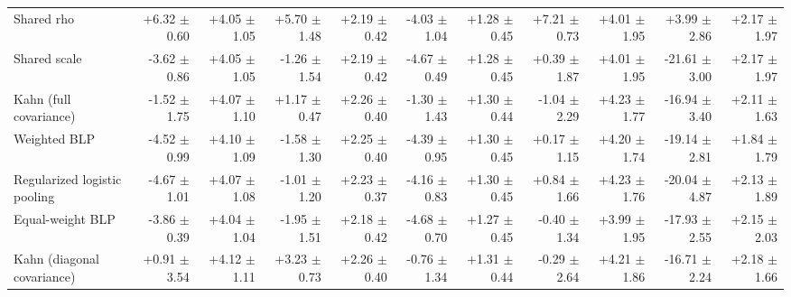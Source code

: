 \begin{tabular}{lrrrrrrrrrr}
Shared rho & +6.32 {\scriptsize $\pm$ 0.60} & +4.05 {\scriptsize $\pm$ 1.05} & +5.70 {\scriptsize $\pm$ 1.48} & +2.19 {\scriptsize $\pm$ 0.42} & -4.03 {\scriptsize $\pm$ 1.04} & +1.28 {\scriptsize $\pm$ 0.45} & +7.21 {\scriptsize $\pm$ 0.73} & +4.01 {\scriptsize $\pm$ 1.95} & +3.99 {\scriptsize $\pm$ 2.86} & +2.17 {\scriptsize $\pm$ 1.97} \\
Shared scale & -3.62 {\scriptsize $\pm$ 0.86} & +4.05 {\scriptsize $\pm$ 1.05} & -1.26 {\scriptsize $\pm$ 1.54} & +2.19 {\scriptsize $\pm$ 0.42} & -4.67 {\scriptsize $\pm$ 0.49} & +1.28 {\scriptsize $\pm$ 0.45} & +0.39 {\scriptsize $\pm$ 1.87} & +4.01 {\scriptsize $\pm$ 1.95} & -21.61 {\scriptsize $\pm$ 3.00} & +2.17 {\scriptsize $\pm$ 1.97} \\
Kahn (full covariance) & -1.52 {\scriptsize $\pm$ 1.75} & +4.07 {\scriptsize $\pm$ 1.10} & +1.17 {\scriptsize $\pm$ 0.47} & +2.26 {\scriptsize $\pm$ 0.40} & -1.30 {\scriptsize $\pm$ 1.43} & +1.30 {\scriptsize $\pm$ 0.44} & -1.04 {\scriptsize $\pm$ 2.29} & +4.23 {\scriptsize $\pm$ 1.77} & -16.94 {\scriptsize $\pm$ 3.40} & +2.11 {\scriptsize $\pm$ 1.63} \\
Weighted BLP & -4.52 {\scriptsize $\pm$ 0.99} & +4.10 {\scriptsize $\pm$ 1.09} & -1.58 {\scriptsize $\pm$ 1.30} & +2.25 {\scriptsize $\pm$ 0.40} & -4.39 {\scriptsize $\pm$ 0.95} & +1.30 {\scriptsize $\pm$ 0.45} & +0.17 {\scriptsize $\pm$ 1.15} & +4.20 {\scriptsize $\pm$ 1.74} & -19.14 {\scriptsize $\pm$ 2.81} & +1.84 {\scriptsize $\pm$ 1.79} \\
Regularized logistic pooling & -4.67 {\scriptsize $\pm$ 1.01} & +4.07 {\scriptsize $\pm$ 1.08} & -1.01 {\scriptsize $\pm$ 1.20} & +2.23 {\scriptsize $\pm$ 0.37} & -4.16 {\scriptsize $\pm$ 0.83} & +1.30 {\scriptsize $\pm$ 0.45} & +0.84 {\scriptsize $\pm$ 1.66} & +4.23 {\scriptsize $\pm$ 1.76} & -20.04 {\scriptsize $\pm$ 4.87} & +2.13 {\scriptsize $\pm$ 1.89} \\
Equal-weight BLP & -3.86 {\scriptsize $\pm$ 0.39} & +4.04 {\scriptsize $\pm$ 1.04} & -1.95 {\scriptsize $\pm$ 1.51} & +2.18 {\scriptsize $\pm$ 0.42} & -4.68 {\scriptsize $\pm$ 0.70} & +1.27 {\scriptsize $\pm$ 0.45} & -0.40 {\scriptsize $\pm$ 1.34} & +3.99 {\scriptsize $\pm$ 1.95} & -17.93 {\scriptsize $\pm$ 2.55} & +2.15 {\scriptsize $\pm$ 2.03} \\
Kahn (diagonal covariance) & +0.91 {\scriptsize $\pm$ 3.54} & +4.12 {\scriptsize $\pm$ 1.11} & +3.23 {\scriptsize $\pm$ 0.73} & +2.26 {\scriptsize $\pm$ 0.40} & -0.76 {\scriptsize $\pm$ 1.34} & +1.31 {\scriptsize $\pm$ 0.44} & -0.29 {\scriptsize $\pm$ 2.64} & +4.21 {\scriptsize $\pm$ 1.86} & -16.71 {\scriptsize $\pm$ 2.24} & +2.18 {\scriptsize $\pm$ 1.66} \\

\end{tabular}
